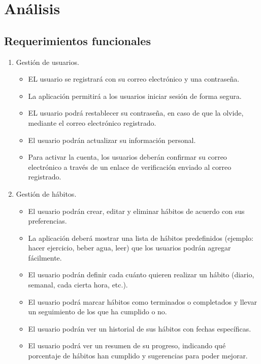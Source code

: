 \documentclass[letterpaper,12pt,oneside]{article}
\begin{document}
    \section{Análisis}
        \subsection{Requerimientos funcionales}
            \begin{enumerate}
                \item Gestión de usuarios.
                \begin{itemize}
                    \item EL usuario se registrará con su correo electrónico y una contraseña.
                    \item La aplicación permitirá a los usuarios iniciar sesión de forma segura.
                    \item EL usuario podrá restablecer su contraseña, en caso de que la olvide, mediante el correo electrónico registrado.
                    \item El usuario podrán actualizar su información personal.
                    \item Para activar la cuenta, los usuarios deberán confirmar su correo electrónico a través de un enlace de verificación enviado al correo registrado.
                \end{itemize}
            \item Gestión de hábitos.
                \begin{itemize}
                    \item El usuario podrán crear, editar y eliminar hábitos de acuerdo con sus preferencias.
                    \item La aplicación deberá mostrar una lista de hábitos predefinidos (ejemplo: hacer ejercicio, beber agua, leer) que los usuarios podrán agregar fácilmente.
                    \item El usuario podrán definir cada cuánto quieren realizar un hábito (diario, semanal, cada cierta hora, etc.).
                    \item El usuario podrá marcar hábitos como terminados o completados y llevar un seguimiento de los que ha cumplido o no.
                    \item El usuario podrán ver un historial de sus hábitos con fechas específicas.
                    \item El usuario podrá ver un resumen de su progreso, indicando qué porcentaje de hábitos han cumplido y sugerencias para poder mejorar.

\end{itemize}
\end{enumerate}
\end{document}
